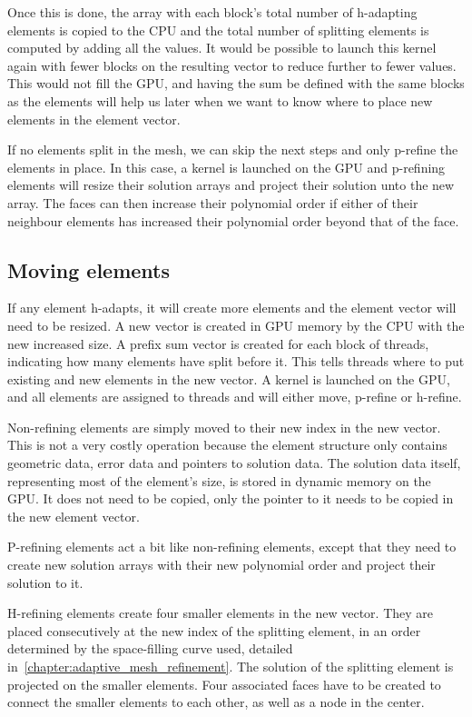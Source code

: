 Once this is done, the array with each block's total number of h-adapting elements is copied to the
CPU and the total number of splitting elements is computed by adding all the values. It would be
possible to launch this kernel again with fewer blocks on the resulting vector to reduce further to
fewer values. This would not fill the GPU, and having the sum be defined with the same blocks as the
elements will help us later when we want to know where to place new elements in the element vector.

If no elements split in the mesh, we can skip the next steps and only p-refine the elements in
place. In this case, a kernel is launched on the GPU and p-refining elements will resize their
solution arrays and project their solution unto the new array. The faces can then increase their
polynomial order if either of their neighbour elements has increased their polynomial order beyond
that of the face. 

\subsection{Moving elements} \label{section:adaptive_mesh_refinement:implementation:moving_elements}


If any element h-adapts, it will create more elements and the element vector will need to be
resized. A new vector is created in GPU memory by the CPU with the new increased size. A prefix sum
vector is created for each block of threads, indicating how many elements have split before it. This
tells threads where to put existing and new elements in the new vector. A kernel is launched on the
GPU, and all elements are assigned to threads and will either move, p-refine or h-refine.

Non-refining elements are simply moved to their new index in the new vector. This is not a very
costly operation because the element structure only contains geometric data, error data and pointers
to solution data. The solution data itself, representing most of the element's size, is stored in
dynamic memory on the GPU. It does not need to be copied, only the pointer to it needs to be copied
in the new element vector. 

P-refining elements act a bit like non-refining elements, except that they need to create new
solution arrays with their new polynomial order and project their solution to it.

H-refining elements create four smaller elements in the new vector. They are placed consecutively at
the new index of the splitting element, in an order determined by the space-filling curve used,
detailed in~\ref{chapter:adaptive_mesh_refinement}. The solution of the splitting element is
projected on the smaller elements. Four associated faces have to be created to connect the smaller
elements to each other, as well as a node in the center. 

